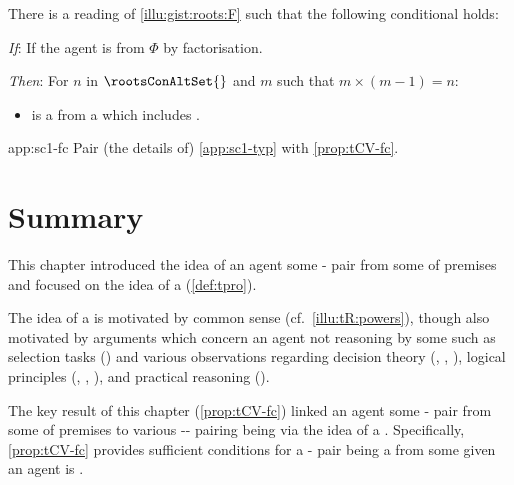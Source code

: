 \begin{note}
  \begin{application}%
    \label{app:sc1-fc}%
    There is a reading of \autoref{illu:gist:roots:F} such that the following conditional holds:
    \begin{itenum}
    \item[\emph{If}:]
      If the agent is \tCV{}  from \(\Phi\) by factorisation.
    \item[\emph{Then}:]
      For \(n\) in  \(\rootsConAltSet{}\) and \(m\) such that \(m \times (m - 1) = n\):
      \begin{itemize}
      \item
         is a \fc{} from a \pool{} which includes .
      \end{itemize}
    \end{itenum}
    \vspace{-\baselineskip}
  \end{application}

  \begin{dets}{app:sc1-fc}
    Pair (the details of) \autoref{app:sc1-typ} with \autoref{prop:tCV-fc}.
  \end{dets}
\end{note}


\section*{Summary}

\begin{note}
  This chapter introduced the idea of an agent \tCV{} some - pair from some \pool{} of premises and focused on the idea of a \tprof{} (\autoref{def:tpro}).

  The idea of a \tpro{} is motivated by common sense (cf.\ \autoref{illu:tR:powers}), though also motivated by arguments which concern an agent not reasoning by some \torN{} such as selection tasks (\cite{Wason:1966aa}) and various observations regarding decision theory (\cite{Allais:1979aa}, \cite{Ellsberg:1961aa}, \cite{Quinn:1990aa}), logical principles (\cite{Makinson:1965aa}, \cite{Kyburg:1997aa}, \cite{Harman:1984aa}), and practical reasoning (\cite{Bratman:1981aa,Bratman:1987aa}).
\end{note}


\begin{note}
  The key result of this chapter (\autoref{prop:tCV-fc}) linked an agent \tCV{} some - pair from some \pool{} of premises to various -- pairing being  via the idea of a \tpro{}.
  Specifically, \autoref{prop:tCV-fc} provides sufficient conditions for a - pair being a \fc{} from some \pool{} given an agent is \tCV{}.
\end{note}







